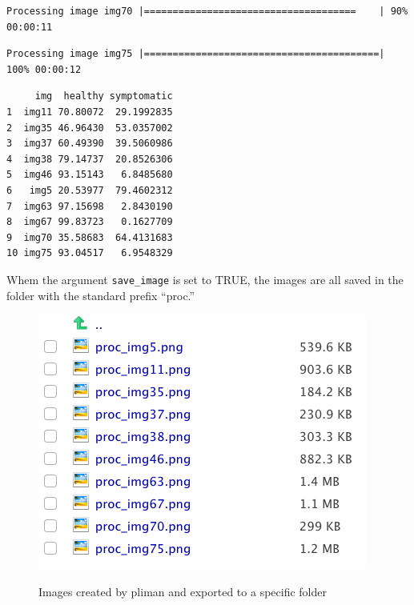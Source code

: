 \documentclass[
  letterpaper,
  DIV=11,
  numbers=noendperiod]{scrreprt}
\newenvironment{Shaded}{\begin{snugshade}}{\end{snugshade}}
\newcommand{\NormalTok}[1]{\textcolor[rgb]{0.00,0.23,0.31}{#1}}
\newcommand{\OtherTok}[1]{\textcolor[rgb]{0.00,0.23,0.31}{#1}}
\newcommand{\SpecialCharTok}[1]{\textcolor[rgb]{0.37,0.37,0.37}{#1}}
\begin{document}
\begin{verbatim}
Processing image img70 |=====================================    | 90% 00:00:11 
\end{verbatim}

\begin{verbatim}
Processing image img75 |=========================================| 100% 00:00:12 
\end{verbatim}

\begin{Shaded}
\end{Shaded}

\begin{verbatim}
     img  healthy symptomatic
1  img11 70.80072  29.1992835
2  img35 46.96430  53.0357002
3  img37 60.49390  39.5060986
4  img38 79.14737  20.8526306
5  img46 93.15143   6.8485680
6   img5 20.53977  79.4602312
7  img63 97.15698   2.8430190
8  img67 99.83723   0.1627709
9  img70 35.58683  64.4131683
10 img75 93.04517   6.9548329
\end{verbatim}

Whem the argument \texttt{save\_image} is set to TRUE, the images are
all saved in the folder with the standard prefix ``proc.''

\begin{figure}

{\centering 

\href{fig_folder}{\includegraphics{imgs/pliman2.png}}

}

\caption{\label{fig-pliman2}Images created by pliman and exported to a
specific folder}

\end{figure}
\end{document}
